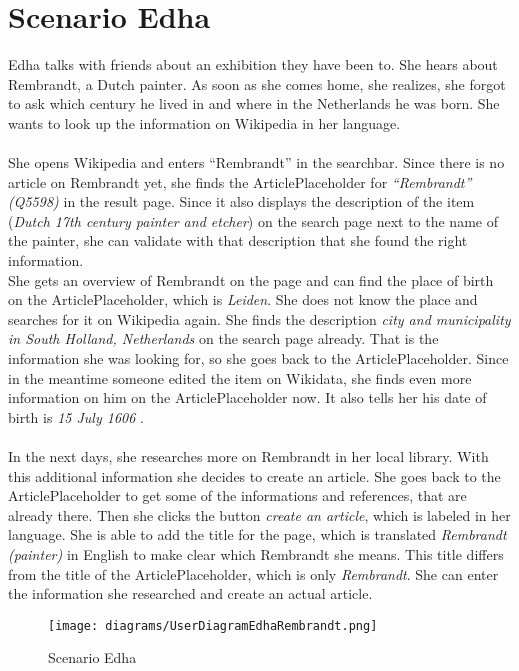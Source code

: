 \section{Scenario Edha} 
Edha talks with friends about an exhibition they have been to. She hears about Rembrandt, a Dutch painter. As soon as she comes home, she realizes, she forgot to ask which century he lived in and where in the Netherlands he was born. She wants to look up the information on Wikipedia in her language. \\
\\ 
She opens Wikipedia and enters ``Rembrandt'' in the searchbar. Since there is no article on Rembrandt yet, she finds the ArticlePlaceholder for \textit{``Rembrandt'' (Q5598)} \citep{wd:01} in the result page. Since it also displays the description of the item (\textit{Dutch 17th century painter and etcher}) on the search page next to the name of the painter, she can validate with that description that she found the right information. \\
She gets an overview of Rembrandt on the page and can find the place of birth on the ArticlePlaceholder, which is \textit{Leiden}. She does not know the place and searches for it on Wikipedia again. She finds the description \textit{city and municipality in South Holland, Netherlands} \citep{wd:02} on the search page already. That is the information she was looking for, so she goes back to the ArticlePlaceholder. Since in the meantime someone edited the item on Wikidata, she finds even more information on him on the ArticlePlaceholder now. It also tells her his date of birth is \textit{15 July 1606} \citep{wd:01}. \\
\\
In the next days, she researches more on Rembrandt in her local library. With this additional information she decides to create an article. She goes back to the ArticlePlaceholder to get some of the informations and references, that are already there. Then she clicks the button \textit{create an article}, which is labeled in her language. She is able to add the title for the page, which is translated \textit{Rembrandt (painter)} in English to make clear which Rembrandt she means. This title differs from the title of the ArticlePlaceholder, which is only \textit{Rembrandt}. She can enter the information she researched and create an actual article.
\begin{figure}[H]
	\centering
	\texttt{[image: diagrams/UserDiagramEdhaRembrandt.png]}
	\caption{Scenario Edha}
	\label{fig:ScenarioEdha}
\end{figure}

